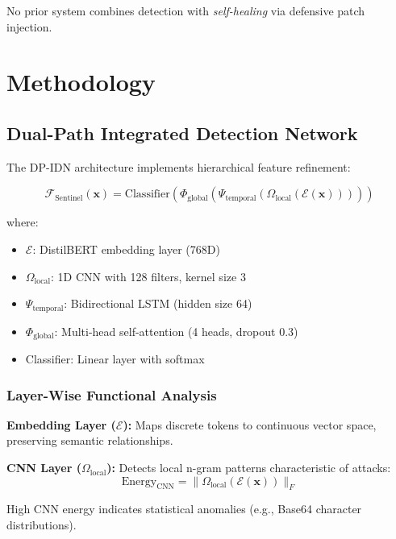 \documentclass[11pt,twocolumn]{article}
\begin{document}
No prior system combines detection with \textit{self-healing} via defensive patch injection.

\section{Methodology}

\subsection{Dual-Path Integrated Detection Network}

The DP-IDN architecture implements hierarchical feature refinement:

\begin{equation}
\mathcal{F}_{\text{Sentinel}}(\mathbf{x}) = \text{Classifier}(\Phi_{\text{global}}(\Psi_{\text{temporal}}(\Omega_{\text{local}}(\mathcal{E}(\mathbf{x})))))
\end{equation}

where:
\begin{itemize}[noitemsep]
    \item $\mathcal{E}$: DistilBERT embedding layer (768D)
    \item $\Omega_{\text{local}}$: 1D CNN with 128 filters, kernel size 3
    \item $\Psi_{\text{temporal}}$: Bidirectional LSTM (hidden size 64)
    \item $\Phi_{\text{global}}$: Multi-head self-attention (4 heads, dropout 0.3)
    \item Classifier: Linear layer with softmax
\end{itemize}

\subsubsection{Layer-Wise Functional Analysis}

\textbf{Embedding Layer ($\mathcal{E}$):} Maps discrete tokens to continuous vector space, preserving semantic relationships.

\textbf{CNN Layer ($\Omega_{\text{local}}$):} Detects local n-gram patterns characteristic of attacks:
\begin{equation}
\text{Energy}_{\text{CNN}} = \|\Omega_{\text{local}}(\mathcal{E}(\mathbf{x}))\|_F
\end{equation}

High CNN energy indicates statistical anomalies (e.g., Base64 character distributions).
\end{document}
